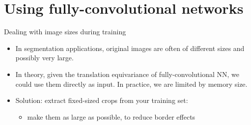 \documentclass[xcolor=pdftex,dvipsnames,table,mathserif]{beamer}
\begin{document}







\section[Using CNNs]{Using fully-convolutional networks}

\begin{frame}{Dealing with image sizes during training}

  \begin{itemize}[<+->]
  \item   In segmentation applications, original images are often of different sizes and possibly very large.
  \item   In theory, given the translation equivariance of fully-convolutional NN, we could use them directly as input. In practice, we are limited by memory size.
  \item   Solution: extract fixed-sized crops from your training set:
    \begin{itemize}
    \item make them as large as possible, to reduce border effects
    \end{itemize}

  \end{itemize}

\end{frame}




\end{document}
